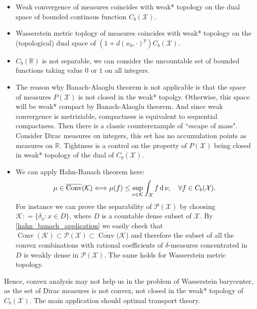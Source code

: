 \begin{rmk}
	\begin{itemize}
		\item Weak convergence of measures coincides with weak* topology on the dual space of bounded continous function $C_b(\mathcal{X})$.
		\item Wasserstein metric toplogy of measures coincides with weak* topology on the (topological) dual space of $(1 + d(x_0, \cdot)^p) C_b(\mathcal{X})$.
		\item $C_b(\mathbb{R})$ is not separable, we can consider the uncountable set of bounded functions taking value $0$ or $1$ on all integers.
		\item The reason why Banach-Alaoglu theorem is not applicable is that the space of measures $P(\mathcal{X})$ is not closed in the weak* topolgy. Otherwise, this space will be weak* compact by Banach-Alaoglu theorem. And since weak convergence is metriziable, compactness is equivalent to sequential compactness. Then there is a classic counterexample of ``escape of mass". Consider Dirac measures on integers, this set has no accumulation points as measures on $\mathbb{R}$. Tightness is a control on the property of $P(\mathcal{X})$ being closed in weak* topology of the dual of $C_b(\mathcal{X})$.
		\item We can apply Hahn-Banach theorem here:
		      \begin{equation}
			      \label{hahn_banach_application}
						\mu \in \overline { \operatorname { Conv } } ( \mathcal { K } ) \Longleftrightarrow \mu(f) \leq \sup _ { \nu \in \mathcal { K } } \int _ { \mathcal{X} } f \operatorname{d} \nu, \quad \forall f \in C _ { b }( \mathcal{X} ).
		      \end{equation}
					For instance we can prove the separability of \( \mathscr { P } ( \mathcal{X} ) \) by choosing \( \mathcal { K }: = \{ \delta _ { x }: x \in D \} \), where \( D \) is a countable dense subset of \( \mathcal{X}\). By \cref{hahn_banach_application} we easily check that \( \operatorname { Conv } (\mathcal { K }) \subset \mathscr { P } ( \mathcal{X} ) \subset \overline { \operatorname { Conv } } (\mathcal { K } \)) and therefore the subset of all the convex combinations with rational coefficients of \( \delta \)-measures concentrated in \( D \) is weakly dense in \( \mathscr { P } ( \mathcal{X} ) \). The same holds for Wasserstein metric topology.

	\end{itemize}
\end{rmk}

Hence, convex analysis may not help us in the problem of Wasserstein barycenter, as the set of Dirac measures is not convex, not closed in the weak* topology of $C_b(\mathcal{X})$. The main application should optimal transport theory.

